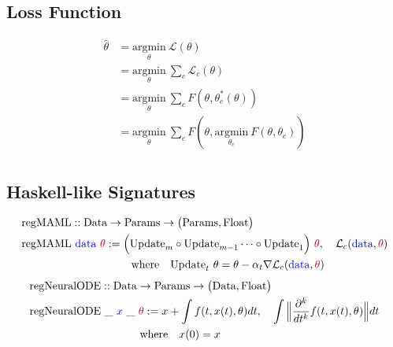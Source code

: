 \documentclass[a4paper,12pt]{article}
\begin{document}
\subsection{Loss Function}
\begin{align*}
    \hat{\theta} &= \underset{\theta}{\textrm{argmin}}\ \mathcal{L}(\theta) \\ 
    &= \underset{\theta}{\textrm{argmin}}\ \sum _c \mathcal{L}_c(\theta)\\ 
    &= \underset{\theta}{\textrm{argmin}}\ \sum _c  F(\theta, \theta^*_c(\theta))\\
    &= \underset{\theta}{\textrm{argmin}}\ \sum _c  F(\theta, \underset{\theta_c}{\textrm{argmin}} \ F(\theta, \theta_c) )\\
\end{align*}
\subsection{Haskell-like Signatures}
\begin{align*} 
&\text{regMAML} :: \text{Data} \rightarrow \text{Params} \rightarrow \big(\textrm{Params}, \text{Float}\big) \\
&\text{regMAML} \ \textcolor{blue}{\text{data}} \ \textcolor{purple}{\theta} := \Big(\text{Update}_m \circ \text{Update}_{m-1} \dots \circ \text{Update}_1 \Big) \ \textcolor{purple}{\theta}, \quad \mathcal{L}_c(\textcolor{blue}{\text{data}}, \textcolor{purple}{\theta})  \\ 
&  \quad \quad \quad \quad \quad \quad \quad \quad \quad \quad \text{where} \quad  \text{Update}_t \  \theta = \theta - \alpha_t \nabla \mathcal{L}_c(\textcolor{blue}{\text{data}}, \textcolor{purple}{\theta})
\end{align*}
\begin{align*}
    &\text{regNeuralODE} :: \text{Data} \rightarrow \text{Params} \rightarrow \big(\textrm{Data}, \text{Float}\big) \\
&\text{regNeuralODE} \ \_ \ \textcolor{blue}{x} \ \_ \ \textcolor{purple}{\theta} := x + \int f(t, x(t), \theta)dt, \quad \int \Big\| \frac{\partial ^k}{dt^k}f(t, x(t), \theta) \Big\|dt \\ 
& \quad \quad \quad \quad \quad \quad \quad \quad \quad \quad \text{where}  \quad x(0)=x \\ \\ 
\end{align*}
\end{document}
